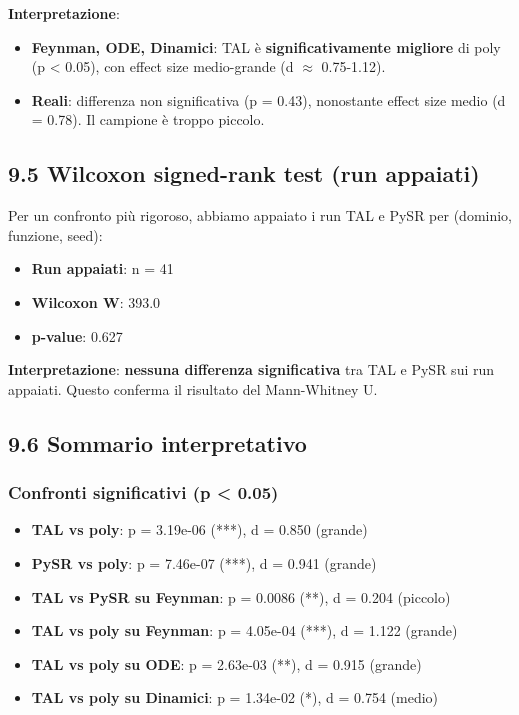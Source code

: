 \documentclass[
]{article}
\providecommand{\tightlist}{%
  \setlength{\itemsep}{0pt}\setlength{\parskip}{0pt}}
\begin{document}
\textbf{Interpretazione}:

\begin{itemize}
\tightlist
\item
  \textbf{Feynman, ODE, Dinamici}: TAL è \textbf{significativamente
  migliore} di poly (p \textless{} 0.05), con effect size medio-grande
  (d $\approx$ 0.75-1.12).
\item
  \textbf{Reali}: differenza non significativa (p = 0.43), nonostante
  effect size medio (d = 0.78). Il campione è troppo piccolo.
\end{itemize}

\subsection{9.5 Wilcoxon signed-rank test (run
appaiati)}\label{wilcoxon-signed-rank-test-run-appaiati}

Per un confronto più rigoroso, abbiamo appaiato i run TAL e PySR per
(dominio, funzione, seed):

\begin{itemize}
\tightlist
\item
  \textbf{Run appaiati}: n = 41
\item
  \textbf{Wilcoxon W}: 393.0
\item
  \textbf{p-value}: 0.627
\end{itemize}

\textbf{Interpretazione}: \textbf{nessuna differenza significativa} tra
TAL e PySR sui run appaiati. Questo conferma il risultato del
Mann-Whitney U.

\subsection{9.6 Sommario interpretativo}\label{sommario-interpretativo}

\subsubsection{Confronti significativi (p \textless{}
0.05)}\label{confronti-significativi-p-0.05}

\begin{itemize}
\tightlist
\item
  \textbf{TAL vs poly}: p = 3.19e-06 (***), d = 0.850 (grande)
\item
  \textbf{PySR vs poly}: p = 7.46e-07 (***), d = 0.941 (grande)
\item
  \textbf{TAL vs PySR su Feynman}: p = 0.0086 (**), d = 0.204 (piccolo)
\item
  \textbf{TAL vs poly su Feynman}: p = 4.05e-04 (***), d = 1.122
  (grande)
\item
  \textbf{TAL vs poly su ODE}: p = 2.63e-03 (**), d = 0.915 (grande)
\item
  \textbf{TAL vs poly su Dinamici}: p = 1.34e-02 (*), d = 0.754 (medio)
\end{itemize}
\end{document}
